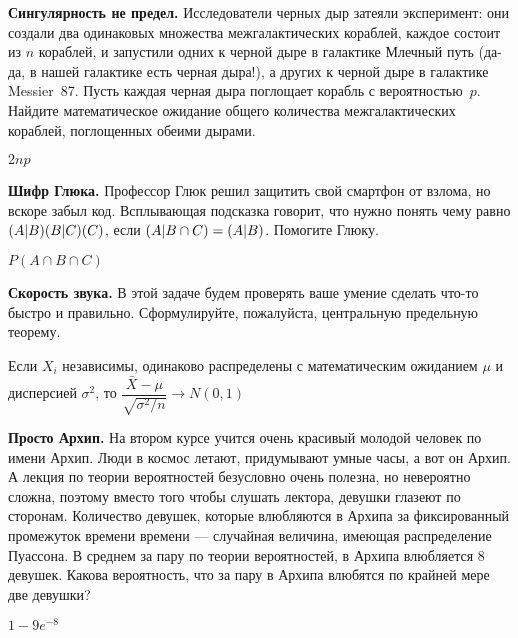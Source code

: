 \documentclass[12pt, addpoints]{exam} %
\let\P\relax
\DeclareMathOperator{\P}{\mathbb{P}}
\begin{document}
\begin{questions}

\question  \textbf{Сингулярность не предел.}  Исследователи черных дыр затеяли эксперимент: они создали два одинаковых множества межгалактических кораблей, каждое состоит из $n$ кораблей, и запустили одних к черной дыре в галактике Млечный путь (да-да, в нашей галактике есть черная дыра!), а других к черной дыре в галактике Messier~87. Пусть каждая черная дыра поглощает корабль с вероятностью~$p$. Найдите математическое ожидание общего количества  межгалактических кораблей, поглощенных обеими дырами.

\begin{solution}
$2np$
\end{solution}

\question \textbf{Шифр Глюка.} Профессор Глюк решил защитить свой смартфон от взлома, но вскоре забыл код. Всплывающая подсказка говорит, что нужно понять чему равно $\P(A|B)\P (B|C)\P (C)$, если $\P (A | B \cap C) = \P (A | B)$. Помогите Глюку.


\begin{solution}
 $P(A \cap B \cap C)$
\end{solution}

\question  \textbf{Скорость звука.} В этой задаче будем проверять ваше умение сделать что-то быстро и правильно. Сформулируйте, пожалуйста, центральную предельную теорему.

\begin{solution}
Если $X_i$ независимы,  одинаково распределены с математическим ожиданием $\mu $ и дисперсией $\sigma^2 $, то $\dfrac{\bar{X} - \mu}{\sqrt{\sigma^2/n}} \rightarrow N(0,1) $
\end{solution}

\question \textbf{Просто Архип.}
На втором курсе учится очень красивый молодой человек по имени Архип. Люди в космос летают, придумывают умные часы, а вот он Архип. А лекция по теории вероятностей безусловно очень полезна, но невероятно сложна, поэтому вместо того чтобы слушать лектора, девушки глазеют по сторонам. Количество девушек, которые влюбляются в Архипа за фиксированный промежуток времени времени --- случайная величина, имеющая распределение Пуассона. В среднем за пару по теории вероятностей, в Архипа влюбляется $8$ девушек. Какова вероятность, что за пару в Архипа влюбятся по крайней мере две девушки?

\begin{solution}
 $1 - 9e^{-8}$
\end{solution}


\end{questions}
\end{document}
